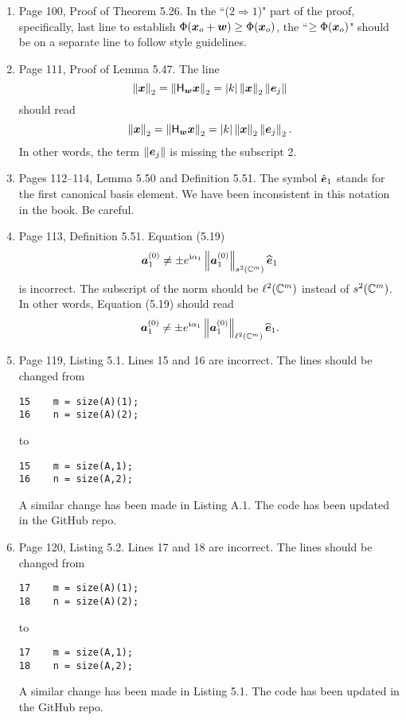 \documentclass{book}
\begin{document}
\begin{enumerate}
	\item
Page 100, Proof of Theorem 5.26. In the ``($2 \Longrightarrow 1$)" part of the  proof, specifically, last line to establish $\Phi(\boldsymbol{x}_o +\boldsymbol{w}) \ge \Phi(\boldsymbol{x}_o)$, the  ``$\ge \Phi(\boldsymbol{x}_o)$" should be on a separate line to follow style guidelines.

	\item
Page 111, Proof of Lemma 5.47. The line
	\[
\left\| \boldsymbol{x} \right\|_2 = \left\| \mathsf{H}_{\boldsymbol{w}}\boldsymbol{x} \right\|_2 = |k|\left\| \boldsymbol{x} \right\|_2\left\| \boldsymbol{e}_j \right\|	
	\]
should read
	\[
\left\| \boldsymbol{x} \right\|_2 = \left\| \mathsf{H}_{\boldsymbol{w}}\boldsymbol{x} \right\|_2 = |k|\left\| \boldsymbol{x} \right\|_2\left\| \boldsymbol{e}_j \right\|_2.	
	\]
In other words, the term $\left\| \boldsymbol{e}_j \right\|$ is missing the subscript 2.

	\item
Pages 112--114, Lemma 5.50 and Definition 5.51. The symbol $\hat{\boldsymbol{e}}_1$ stands for the first canonical basis element. We have been inconsistent in this notation in the book. Be careful.

	\item
Page 113, Definition 5.51.  Equation (5.19) 
	\[
  \boldsymbol{a}_1^{(0)} \ne  \pm e^{\mathfrak{i} \alpha_1}\left\| \boldsymbol{a}_1^{(0)} \right\|_{s^2(\mathbb C^m)}\widehat{\boldsymbol{e}}_1 
	\]
is incorrect. The subscript of the norm should be $\ell^2(\mathbb C^m)$ instead of $s^2(\mathbb C^m)$. In other words,  Equation (5.19) should read 
	\[
  \boldsymbol{a}_1^{(0)} \ne  \pm e^{\mathfrak{i} \alpha_1}\left\| \boldsymbol{a}_1^{(0)} \right\|_{\ell^2(\mathbb C^m)}\widehat{\boldsymbol{e}}_1 .
	\]
	
	\item
Page 119, Listing 5.1. Lines 15 and 16 are incorrect. The lines should be changed from
	\begin{verbatim}
15    m = size(A)(1);
16    n = size(A)(2);	
	\end{verbatim}
to 
	\begin{verbatim}
15    m = size(A,1);
16    n = size(A,2);	
	\end{verbatim}
A similar change has been made in Listing A.1. The code has been updated in the GitHub repo.

	\item
Page 120, Listing 5.2. Lines 17 and 18 are incorrect. The lines should be changed from
	\begin{verbatim}
17    m = size(A)(1);
18    n = size(A)(2);	
	\end{verbatim}
to 
	\begin{verbatim}
17    m = size(A,1);
18    n = size(A,2);	
	\end{verbatim}
A similar change has been made in Listing 5.1. The code has been updated in the GitHub repo.

	
	
	\end{enumerate}
	
\end{document}
